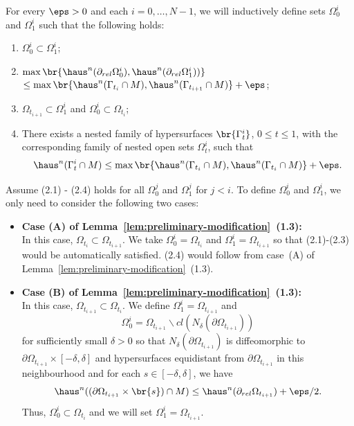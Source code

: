 For every $\eps > 0$ and each $i = 0, \dots, N - 1$, we will inductively define sets $\Omega_0^i$ and $\Omega_1^i$ such that the following holds:
\begin{enumerate}
    \item[(2.1)] $\Omega_0^i \subset \Omega_1^i$;
    \item[(2.2)] $\max\br{\haus^n(\partial_{rel}\Omega_0^i), \haus^n(\partial_{rel}\Omega_1^i))}$ \\
    $\leq \max\br{\haus^n(\Gamma_{t_i}\cap M), \haus^n(\Gamma_{t_{i + 1}}\cap M)} + \eps$;
    \item[(2.3)] $\Omega_{t_{i + 1}} \subset \Omega_1^i$ and $\Omega_0^i \subset \Omega_{t_i}$;
    \item[(2.4)] There exists a nested family of hypersurfaces $\br{\Gamma_t^i}$, $0 \leq t \leq 1$, with the corresponding family of nested open sets $\Omega_t^i$, such that 
    \begin{equation*}
        \haus^n(\Gamma_t^i\cap M) \leq \max\br{\haus^n(\Gamma_{t_i}\cap M), \haus^n(\Gamma_{t_i}\cap M)} + \eps.
    \end{equation*}
\end{enumerate}
Assume (2.1) - (2.4) holds for all $\Omega_0^j$ and $\Omega_1^j$ for $j < i$. To define $\Omega_0^i$ and $\Omega_1^i$, we only need to consider the following two cases:
\begin{itemize}
    \item \textbf{Case (A) of Lemma~\ref{lem:preliminary-modification}~(1.3):}\\
    In this case, $\Omega_{t_i} \subset \Omega_{t_{i + 1}}$. We take $\Omega_0^i = \Omega_{t_i}$ and $\Omega_1^i = \Omega_{t_{i + 1}}$ so that (2.1)-(2.3) would be automatically satisfied. (2.4) would follow from case~(A) of Lemma~\ref{lem:preliminary-modification}~(1.3).
    \item \textbf{Case (B) of Lemma~\ref{lem:preliminary-modification}~(1.3):}\\
    In this case, $\Omega_{t_{i + 1}} \subset \Omega_{t_i}$. We define $\Omega_1^i = \Omega_{t_{i + 1}}$ and 
    \begin{equation*}
        \Omega_0^i = \Omega_{t_{i + 1}}\backslash cl(N_\delta(\partial\Omega_{t_{i + 1}}))
    \end{equation*}
    for sufficiently small $\delta > 0$ so that $N_\delta(\partial\Omega_{t_{i + 1}})$ is diffeomorphic to $\partial\Omega_{t_{i + 1}} \times [-\delta, \delta]$ and hypersurfaces equidistant from $\partial\Omega_{t_{i + 1}}$ in this neighbourhood and for each $s \in [-\delta, \delta]$, we have
    \begin{equation*}
        \haus^n((\partial\Omega_{t_{i + 1}}\times \br{s})\cap M) \leq \haus^n(\partial_{rel}\Omega_{t_{i + 1}}) + \eps/2.
    \end{equation*}
    Thus, $\Omega_0^i \subset \Omega_{t_i}$ and we will set $\Omega_1^i = \Omega_{t_{i + 1}}$. 
\end{itemize}

